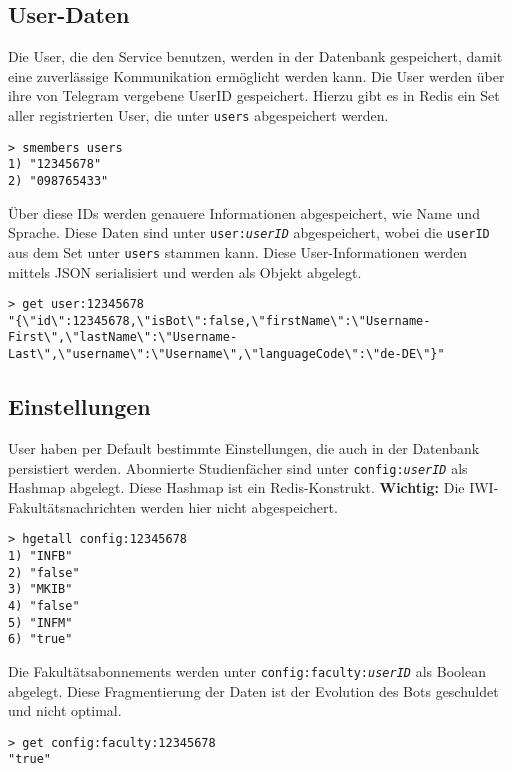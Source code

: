\subsection{User-Daten}
Die User, die den Service benutzen, werden in der Datenbank gespeichert, damit eine zuverlässige Kommunikation ermöglicht werden kann. Die User werden über ihre von Telegram vergebene UserID gespeichert. Hierzu gibt es in Redis ein Set aller registrierten User, die unter \texttt{users} abgespeichert werden.

\begin{lstlisting}[caption={Abfrage aller User IDs}]
> smembers users
1) "12345678"
2) "098765433"
\end{lstlisting}

Über diese IDs werden genauere Informationen abgespeichert, wie Name und Sprache. Diese Daten sind unter \texttt{user:\textit{userID}} abgespeichert, wobei die \texttt{userID} aus dem Set unter \texttt{users} stammen kann. Diese User-Informationen werden mittels JSON serialisiert und werden als Objekt abgelegt.

\begin{lstlisting}[caption={User-Informationen abfragen}]
> get user:12345678
"{\"id\":12345678,\"isBot\":false,\"firstName\":\"Username-First\",\"lastName\":\"Username-Last\",\"username\":\"Username\",\"languageCode\":\"de-DE\"}"
\end{lstlisting}

\subsection{Einstellungen}
User haben per Default bestimmte Einstellungen, die auch in der Datenbank persistiert werden. Abonnierte Studienfächer sind unter \texttt{config:\textit{userID}} als Hashmap abgelegt. Diese Hashmap ist ein Redis-Konstrukt. \textbf{Wichtig:} Die IWI-Fakultätsnachrichten werden hier nicht abgespeichert.

\begin{lstlisting}[caption={Abo-Einstellungen eines Users}]
> hgetall config:12345678
1) "INFB"
2) "false"
3) "MKIB"
4) "false"
5) "INFM"
6) "true"
\end{lstlisting}

Die Fakultätsabonnements werden unter \texttt{config:faculty:\textit{userID}} als Boolean abgelegt. Diese Fragmentierung der Daten ist der Evolution des Bots geschuldet und nicht optimal.

\begin{lstlisting}[caption={Fakultätsabo-Einstellungen eines Users}]
> get config:faculty:12345678
"true"
\end{lstlisting}

